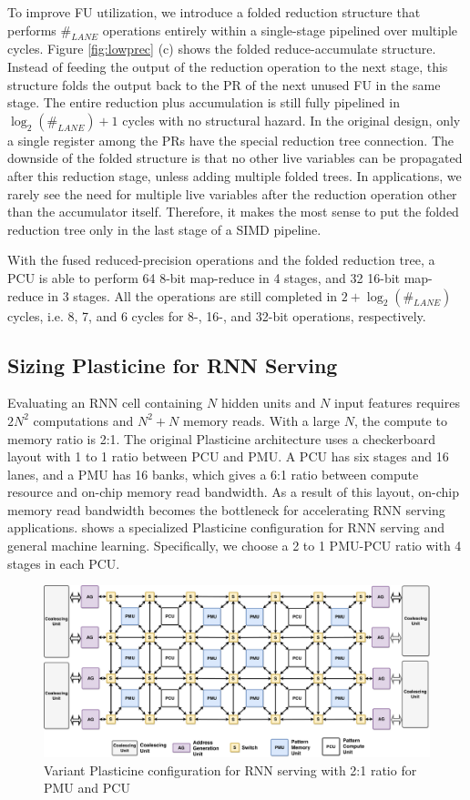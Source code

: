To improve FU utilization, we introduce a folded reduction structure that performs $\#_{LANE}$
operations entirely within a single-stage pipelined over multiple cycles.
Figure \ref{fig:lowprec} (c) shows the folded reduce-accumulate structure.
Instead of feeding the output of the reduction operation to the next stage, 
this structure folds the output back to the PR of the next unused FU in the same stage. 
The entire reduction plus accumulation is still fully pipelined in $\log_2(\#_{LANE})+1$ cycles
with no structural hazard.
In the original design, only a single register among the PRs have the special reduction tree
connection.
The downside of the folded structure is that no other live variables can be propagated after this
reduction stage, unless adding multiple folded trees. 
In applications, we rarely see the need for multiple live variables after the reduction operation
other than the accumulator itself.
Therefore, it makes the most sense to put the
folded reduction tree only in the last stage of a SIMD pipeline.

With the fused reduced-precision operations and the folded reduction tree,
  a PCU is able to perform 64 8-bit map-reduce in 4 stages, and 32 16-bit map-reduce in 3 stages.
All the operations are still completed in $2+\log_2(\#_{LANE})$ cycles, i.e. 
8, 7, and 6 cycles for 8-, 16-, and 32-bit operations, respectively.

\subsection{Sizing Plasticine for RNN Serving} \label{sec:sizing}
Evaluating an RNN cell containing $N$ hidden units and $N$ input features
  requires $2N^2$ computations and $N^2+N$ memory reads.
With a large $N$, the compute to memory ratio is 2:1.
The original Plasticine architecture uses a checkerboard layout
  with 1 to 1 ratio between PCU and PMU.
A PCU has six stages and 16 lanes, and a PMU has 16 banks, which gives a 6:1 ratio between
  compute resource and on-chip memory read bandwidth.
As a result of this layout,
  on-chip memory read bandwidth becomes the bottleneck for accelerating RNN serving applications.
 shows a specialized Plasticine configuration for RNN serving and general machine
learning.
Specifically, we choose a 2 to 1 PMU-PCU ratio with 4 stages in each PCU.
\begin{figure}
  \centering
  \includegraphics[width=\textwidth]{figs/rnnarch.pdf}
  \caption[Variant Plasticine configuration for RNN serving]{
    Variant Plasticine configuration for RNN serving with 2:1 ratio for PMU and PCU}
  \label{fig:rnnarch}
\end{figure}
